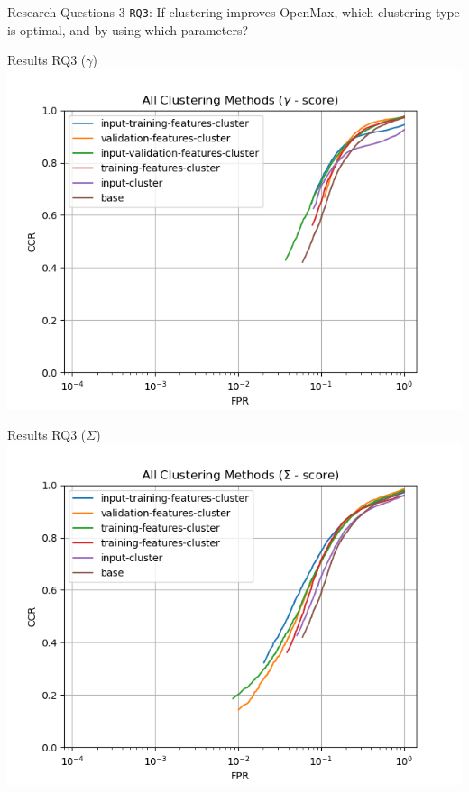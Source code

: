 \begin{frame}{Research Questions 3}
	\texttt{RQ3}: If clustering improves OpenMax, which clustering type is optimal, and by using which parameters?
\end{frame}

\begin{frame}{Results RQ3 ($\gamma$)}
	\includegraphics[width=\textwidth]{figures/all_methods_gamma.png}
\end{frame}

\begin{frame}{Results RQ3 ($\Sigma$)}
	\includegraphics[width=\textwidth]{figures/all_methods_sigma.png}
\end{frame}
